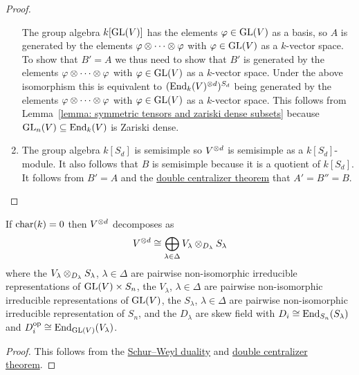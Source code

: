 \begin{proof}
\begin{enumerate}
      The group algebra $k[\operatorname{GL}(V)]$ has the elements $\varphi \in \operatorname{GL}(V)$ as a basis, so $A$ is generated by the elements $\varphi \mathbin{\otimes} \dotsb \mathbin{\otimes} \varphi$ with $\varphi \in \operatorname{GL}(V)$ as a $k$-vector space.
      To show that $B' = A$ we thus need to show that $B'$ is generated by the elements $\varphi \mathbin{\otimes} \dotsb \mathbin{\otimes} \varphi$ with $\varphi \in \operatorname{GL}(V)$ as a $k$-vector space.
      Under the above isomorphism this is equivalent to $(\operatorname{End}_k(V)^{\mathbin{\otimes} d})^{S_d}$ being generated by the elements $\varphi \mathbin{\otimes} \dotsb \mathbin{\otimes} \varphi$ with $\varphi \in \operatorname{GL}(V)$ as a $k$-vector space.
      This follows from Lemma~\ref{lemma: symmetric tensors and zariski dense subsets} because $\operatorname{GL}_n(V) \subseteq \operatorname{End}_k(V)$ is Zariski dense.
    \item
      The group algebra $k[S_d]$ is semisimple so $V^{\mathbin{\otimes} d}$ is semisimple as a $k[S_d]$-module.
      It also follows that $B$ is semisimple because it is a quotient of $k[S_d]$.
      It follows from $B' = A$ and the \hyperref[corollary: special double centralizer theorem]{double centralizer theorem} that $A' = B'' = B$.
    \qedhere
  \end{enumerate}
\end{proof}


\begin{corollary}
  If $\operatorname{char}(k) = 0$ then $V^{\mathbin{\otimes} d}$ decomposes as
  \[
          V^{\mathbin{\otimes} d}
    \cong \bigoplus_{\lambda \in \Delta} V_\lambda \mathbin{\otimes}_{D_\lambda} S_\lambda
  \]
  where the $V_\lambda \mathbin{\otimes}_{D_\lambda} S_\lambda$, $\lambda \in \Delta$ are pairwise non-isomorphic irreducible representations of $\operatorname{GL}(V) \times S_n$, the $V_\lambda$, $\lambda \in \Delta$ are pairwise non-isomorphic irreducible representations of $\operatorname{GL}(V)$, the $S_\lambda$, $\lambda \in \Delta$ are pairwise non-isomorphic irreducible representation of $S_n$, and the $D_\lambda$ are skew field with $D_i \cong \operatorname{End}_{S_n}(S_\lambda)$ and $D_i^{\operatorname{op}} \cong \operatorname{End}_{\operatorname{GL}(V)}(V_\lambda)$.
\end{corollary}


\begin{proof}
  This follows from the \hyperref[theorem: schur weyl duality]{Schur--Weyl duality} and \hyperref[corollary: special double centralizer theorem]{double centralizer theorem}.
\end{proof}


